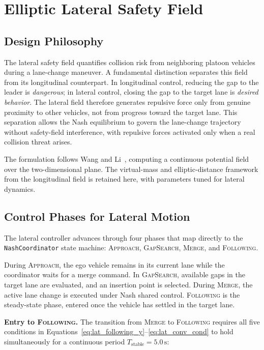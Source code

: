\documentclass[12pt,a4paper,oneside]{report}
\begin{document}
\section{Elliptic Lateral Safety Field}
\label{sec:lateral_field}

\subsection{Design Philosophy}

The lateral safety field quantifies collision risk from neighboring platoon vehicles during a lane-change maneuver. A fundamental distinction separates this field from its longitudinal counterpart. In longitudinal control, reducing the gap to the leader is \textit{dangerous}; in lateral control, closing the gap to the target lane is \textit{desired behavior}. The lateral field therefore generates repulsive force only from genuine proximity to other vehicles, not from progress toward the target lane. This separation allows the Nash equilibrium to govern the lane-change trajectory without safety-field interference, with repulsive forces activated only when a real collision threat arises.

The formulation follows Wang and Li~\cite{wangDrivingSafetyField2015,wangDrivingSafetyField2016,liSharedControlNovel2019}, computing a continuous potential field over the two-dimensional plane. The virtual-mass and elliptic-distance framework from the longitudinal field is retained here, with parameters tuned for lateral dynamics.

\subsection{Control Phases for Lateral Motion}
\label{sec:lat_phases}

The lateral controller advances through four phases that map directly to the \texttt{NashCoordinator} state machine: \textsc{Approach}, \textsc{GapSearch}, \textsc{Merge}, and \textsc{Following}.

During \textsc{Approach}, the ego vehicle remains in its current lane while the coordinator waits for a merge command. In \textsc{GapSearch}, available gaps in the target lane are evaluated, and an insertion point is selected. During \textsc{Merge}, the active lane change is executed under Nash shared control. \textsc{Following} is the steady-state phase, entered once the vehicle has settled in the target lane.

\textbf{Entry to \textsc{Following}.} The transition from \textsc{Merge} to \textsc{Following} requires all five conditions in Equations~\ref{eq:lat_following_y}--\ref{eq:lat_conv_cond} to hold simultaneously for a continuous period $T_{\mathrm{stable}} = 5.0\,\mathrm{s}$:
\end{document}
